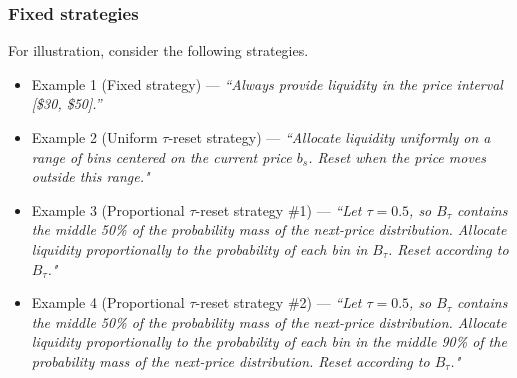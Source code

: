 \documentclass[sigconf, usenames, dvipsnames]{acmart}
\begin{document}
\subsubsection{Fixed strategies}

\fi

For illustration, consider the following  strategies.


\begin{itemize}
    \item[] Example 1 (Fixed strategy) --- \textit{``Always provide liquidity in the price interval [\$30, \$50].''}
\end{itemize}

\begin{itemize}
    \item[] Example 2 (Uniform $\tau$-reset strategy) --- \textit{``Allocate  liquidity uniformly on a range of bins centered on the current price $b_s$. Reset when the price moves outside this range."}
\end{itemize}


\begin{itemize}
    \item[] Example 3 (Proportional $\tau$-reset strategy \#1) --- \textit{``Let $\tau=0.5$, so $B_{\tau}$ contains the middle 50\% of the probability mass of the next-price distribution. Allocate liquidity proportionally to the probability of each bin in $B_{\tau}$. Reset according to $B_\tau$."}
\end{itemize}

\begin{itemize}
    \item[] Example 4 (Proportional $\tau$-reset strategy \#2) --- \textit{``Let $\tau=0.5$, so $B_{\tau}$ contains the middle 50\% of the probability mass of the next-price distribution. Allocate liquidity proportionally to the probability of each bin in the middle 90\% of the probability mass of the next-price distribution. Reset according to $B_\tau$."}
\end{itemize}
\end{document}
